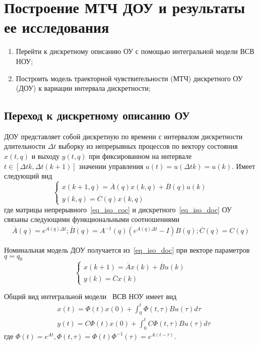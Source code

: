 \section{Построение МТЧ ДОУ и результаты ее исследования}

\begin{enumerate}
	\item Перейти к дискретному описанию ОУ с помощью интегральной модели ВСВ НОУ;
	\item Построить модель траекторной чувствительности (МТЧ) дискретного ОУ (ДОУ) к вариации интервала дискретности;
\end{enumerate}


\subsection{Переход к дискретному описанию ОУ}

ДОУ представляет собой дискретную по времени с интервалом дискретности
длительности $\Delta t$ выборку из непрерывных процессов по вектору
состояния $x(t,q)$ и выходу $y(t,q)$ при фиксированном на интервале $t \in \left[\Delta t k, \Delta t(k+1)\right]$ значении управления $u(t) = u(\Delta t k) = u(k)$. Имеет следующий вид
\begin{equation}\label{eq_iso_doc}
	\begin{cases}
		x(k+1, q) = \overline{A}(q) x(k, q) + \overline{B}(q) u(k)\\
		y(k, q) = \overline{C}(q) x(k, q)
	\end{cases}
\end{equation}
где матрицы непрерывного~\ref{eq_iso_coc} и дискретного~\ref{eq_iso_doc} ОУ связаны следующими функциональными соотношениями
\begin{align}
	\overline{A}(q) = e^{A(q) \Delta t}; \overline{B}(q) = A^{-1}(q)(e^{A(q) \Delta t} - I)B(q); \overline{C}(q) = C(q)
\end{align}


Номинальная модель ДОУ получается из~\ref{eq_iso_doc} при векторе параметров $q=q_0$
\begin{equation}\label{eq_iso_doc_n}
	\begin{cases}
		x(k+1) = \overline{A} x(k) + \overline{B} u(k)\\
		y(k) = \overline{C} x(k)
	\end{cases}
\end{equation}

Общий вид интегральной модели~\cite{MIROSH} ВСВ НОУ имеет вид
\begin{align}
	&x(t) = \Phi (t) x(0) + \int_0^t \Phi (t, \tau) B u(\tau) d \tau \\
	&y(t) = C \Phi (t) x(0) + \int_0^t C \Phi(t, \tau) B u(\tau) d \tau 
\end{align}
где $\Phi(t) = e^{At}, \Phi(t, \tau) = \Phi(t) \Phi^{-1}(\tau) = e^{A(t-\tau)}$.

